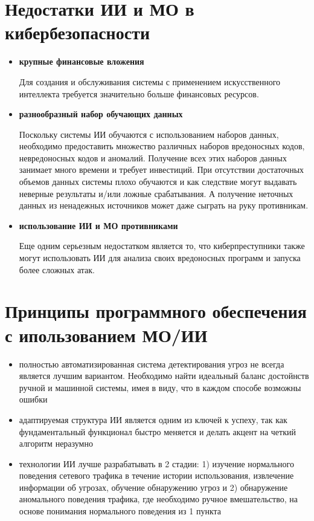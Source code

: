 \documentclass{article}
\begin{document}
	\section*{Недостатки ИИ и МО в кибербезопасности}
	\begin{itemize}
		\item \textbf{крупные финансовые вложения}
		
		Для создания и обслуживания системы с применением искусственного интеллекта требуется значительно больше финансовых ресурсов.
		\item \textbf{разнообразный набор обучающих данных}
		
		Поскольку системы ИИ обучаются с использованием наборов данных, необходимо предоставить множество различных наборов вредоносных кодов, невредоносных кодов и аномалий. Получение всех этих наборов данных занимает много времени и требует инвестиций.
		При отсутствии достаточных объемов данных системы плохо обучаются и как следствие могут выдавать неверные результаты и/или ложные срабатывания. А получение неточных данных из ненадежных источников может даже сыграть на руку противникам.
		\item \textbf{использование ИИ и МО противниками}
		
		Еще одним серьезным недостатком является то, что киберпреступники также могут использовать ИИ для анализа своих вредоносных программ и запуска более сложных атак.
		
	\end{itemize}
	
	\section*{Принципы программного обеспечения с ипользованием МО/ИИ}
	\begin{itemize}
		\item полностью автоматизированная система детектирования угроз не всегда является лучшим вариантом. Необходимо найти идеальный баланс достойнств ручной и машинной системы, имея в виду, что в каждом способе возможны ошибки
		\item адаптируемая структура ИИ является одним из ключей к успеху, так как фундаментальный функционал быстро меняется и делать акцент на четкий алгоритм неразумно
		\item технологии ИИ лучше разрабатывать в 2 стадии: 1) изучение нормального поведения сетевого трафика в течение истории использования, извлечение информации об угрозах, обучение обнаружению угроз и 2) обнаружение аномального поведения трафика, где необходимо ручное вмешательство, на основе понимания нормального поведения из 1 пункта
		
	\end{itemize}
	
\end{document}
